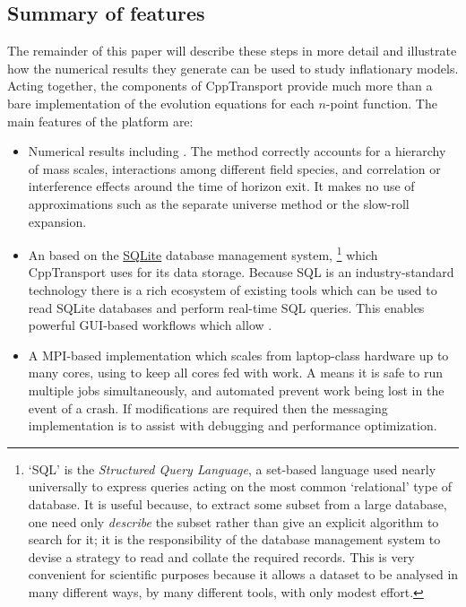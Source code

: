 \documentclass[11pt,a4paper]{article}
\newcommand{\packagefont}{\sffamily}
\newcommand{\CppTransport}{{\packagefont CppTransport}}
\newcommand{\MPI}{{\packagefont MPI}}
\newcommand{\SQLite}{{\packagefont SQLite}}
\newcommand{\semibold}[1]{{\fontseries{b}\selectfont{#1}}}
\begin{document}
\subsection{Summary of features}
The remainder of this paper will describe these steps
in more detail
and illustrate how the numerical results they generate can be
used to study inflationary models.
Acting together, the components
of {\CppTransport} provide much more than a bare implementation
of the evolution equations for each $n$-point function.
The main features of the platform are:
\begin{itemize}
    \item Numerical results including \semibold{all relevant
    field-theory effects at tree-level}.
    The method correctly accounts for
    a hierarchy of mass scales,
    interactions among different field species,
    and correlation or interference effects
    around the time of horizon exit.
    It makes no use of approximations
    such as the separate universe method or the slow-roll
    expansion.
    
    \item An \semibold{SQL-based workflow} based on
    the \href{http://sqlite.org}{\SQLite} database
    management system,%
        \footnote{`SQL' is the \emph{Structured Query Language},
        a set-based language used nearly universally
        to express queries acting on the most common `relational' type
        of database. It is useful because, to extract
        some subset from a large database, one need only \emph{describe}
        the subset rather than give an explicit algorithm to search for it;
        it is the responsibility of the database management system
        to devise a strategy to read and collate the required records.
        This is very convenient for
        scientific purposes
        because it allows a dataset to be analysed in
        many different ways, by many different tools,
        with only modest effort.}
    which
    {\CppTransport} uses for its data storage.
    Because SQL is an industry-standard technology
    there is a rich ecosystem of existing
    tools which can be used to
    read SQLite databases and perform real-time SQL queries.
    This enables powerful GUI-based workflows which allow
    \semibold{scientific exploitation and analysis without
    extensive programming}.

    \item A \semibold{fully parallelized} {\MPI}-based implementation which
    scales from laptop-class hardware up to many cores, using
    \semibold{adaptive load-balancing} to keep all cores fed with work.
    A \semibold{transactional design} means it is safe to run multiple
    jobs simultaneously,
    and automated \semibold{checkpointing and recovery} prevent
    work being lost in the event of a crash.
    If modifications are required then the messaging implementation is
    \semibold{automatically instrumented} to assist with debugging and
    performance optimization.
    

\end{itemize}
\end{document}
